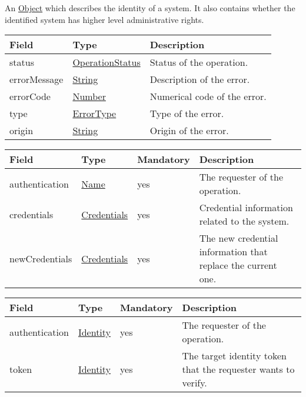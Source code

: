 \documentclass[a4paper]{arrowhead}
\newcommand{\pref}[1]{{\textcolor{ArrowheadGrey}{\hyperref[sec:model:primitives:#1]{#1}}}}
\begin{document}

An \pref{Object} which describes the identity of a system. It also contains whether the identified system has higher level administrative rights.


\begin{table}[ht!]
\begin{tabularx}{\textwidth}{| p{4.25cm} | p{3.5cm} | X |} \hline
\rowcolor{gray!33} Field & Type      & Description \\ \hline
status & \pref{OperationStatus} & Status of the operation. \\ \hline
errorMessage & \pref{String} & Description of the error. \\ \hline
errorCode &\pref{Number}  & Numerical code of the error. \\ \hline
type & \pref{ErrorType} & Type of the error. \\ \hline
origin & \pref{String} & Origin of the error. \\ \hline
\end{tabularx}
\end{table}


\begin{table}[ht!]
\begin{tabularx}{\textwidth}{| p{3cm} | p{3cm} | p{2cm} | X |} \hline
\rowcolor{gray!33} Field & Type & Mandatory & Description \\ \hline
authentication & \pref{Name} & yes & The requester of the operation. \\ \hline
credentials & \hyperref[sec:model:Credentials]{Credentials} & yes & Credential information related to the system. \\ \hline
newCredentials &\hyperref[sec:model:Credentials]{Credentials} & yes & The new credential information that replace the current one. \\ \hline
\end{tabularx}
\end{table}


\begin{table}[ht!]
\begin{tabularx}{\textwidth}{| p{3cm} | p{3cm} | p{2cm} | X |} \hline
\rowcolor{gray!33} Field & Type & Mandatory & Description \\ \hline
authentication &\hyperref[sec:model:Identity]{Identity} & yes & The requester of the operation. \\ \hline
token &\hyperref[sec:model:Identity]{Identity} & yes & The target identity token that the requester wants to verify. \\ \hline
\end{tabularx}
\end{table}
\end{document}

